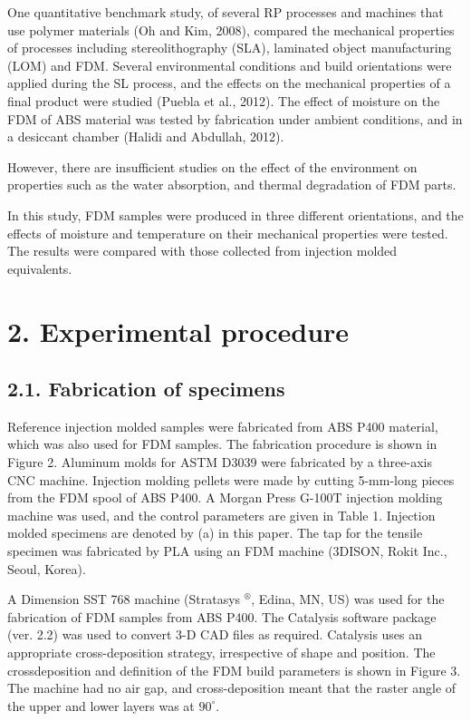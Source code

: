 \documentclass[10pt]{article}
\begin{document}
One quantitative benchmark study, of several RP processes and machines that use polymer materials (Oh and Kim, 2008), compared the mechanical properties of processes including stereolithography (SLA), laminated object manufacturing (LOM) and FDM. Several environmental conditions and build orientations were applied during the SL process, and the effects on the mechanical properties of a final product were studied (Puebla et al., 2012). The effect of moisture on the FDM of ABS material was tested by fabrication under ambient conditions, and in a desiccant chamber (Halidi and Abdullah, 2012).

However, there are insufficient studies on the effect of the environment on properties such as the water absorption, and thermal degradation of FDM parts.

In this study, FDM samples were produced in three different orientations, and the effects of moisture and temperature on their mechanical properties were tested. The results were compared with those collected from injection molded equivalents.

\section*{2. Experimental procedure}
\subsection*{2.1. Fabrication of specimens}
Reference injection molded samples were fabricated from ABS P400 material, which was also used for FDM samples. The fabrication procedure is shown in Figure 2. Aluminum molds for ASTM D3039 were fabricated by a three-axis CNC machine. Injection molding pellets were made by cutting 5-mm-long pieces from the FDM spool of ABS P400. A Morgan Press G-100T injection molding machine was used, and the control parameters are given in Table 1. Injection molded specimens are denoted by (a) in this paper. The tap for the tensile specimen was fabricated by PLA using an FDM machine (3DISON, Rokit Inc., Seoul, Korea).

A Dimension SST 768 machine (Stratasys ${ }^{\circledR}$, Edina, MN, US) was used for the fabrication of FDM samples from ABS P400. The Catalysis software package (ver. 2.2) was used to convert 3-D CAD files as required. Catalysis uses an appropriate cross-deposition strategy, irrespective of shape and position. The crossdeposition and definition of the FDM build parameters is shown in Figure 3. The machine had no air gap, and cross-deposition meant that the raster angle of the upper and lower layers was at $90^{\circ}$.
\end{document}
